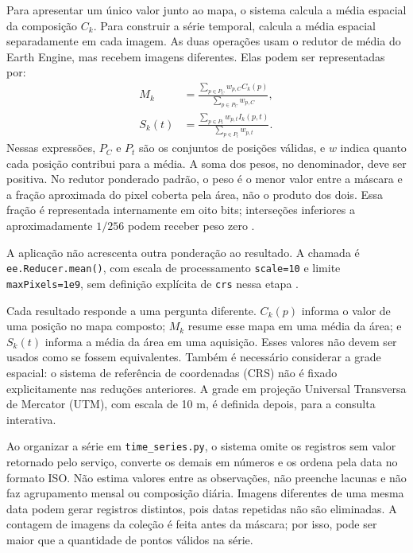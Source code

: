Para apresentar um único valor junto ao mapa, o sistema calcula a média espacial da composição $C_k$. Para construir a série temporal, calcula a média espacial separadamente em cada imagem. As duas operações usam o redutor de média do Earth Engine, mas recebem imagens diferentes. Elas podem ser representadas por:
\begin{align}
 M_k&=\frac{\sum_{p\in P_C}w_{p,C}C_k(p)}
                {\sum_{p\in P_C}w_{p,C}},\label{eq:media-composto}\\
 S_k(t)&=\frac{\sum_{p\in P_t}w_{p,t}I_k(p,t)}
                  {\sum_{p\in P_t}w_{p,t}}.\label{eq:serie-final}
\end{align}
Nessas expressões, $P_C$ e $P_t$ são os conjuntos de posições válidas, e $w$ indica quanto cada posição contribui para a média. A soma dos pesos, no denominador, deve ser positiva. No redutor ponderado padrão, o peso é o menor valor entre a máscara e a fração aproximada do pixel coberta pela área, não o produto dos dois. Essa fração é representada internamente em oito bits; interseções inferiores a aproximadamente $1/256$ podem receber peso zero \citep{GOOGLE_EE_REGION}.

A aplicação não acrescenta outra ponderação ao resultado. A chamada é \texttt{ee.Reducer.mean()}, com escala de processamento \texttt{scale=10} e limite \texttt{maxPixels=1e9}, sem definição explícita de \texttt{crs} nessa etapa \citep{GOOGLE_EE_REDUCE}.

Cada resultado responde a uma pergunta diferente. $C_k(p)$ informa o valor de uma posição no mapa composto; $M_k$ resume esse mapa em uma média da área; e $S_k(t)$ informa a média da área em uma aquisição. Esses valores não devem ser usados como se fossem equivalentes. Também é necessário considerar a grade espacial: o sistema de referência de coordenadas (CRS) não é fixado explicitamente nas reduções anteriores. A grade em projeção Universal Transversa de Mercator (UTM), com escala de 10 m, é definida depois, para a consulta interativa.

Ao organizar a série em \texttt{time\_series.py}, o sistema omite os registros sem valor retornado pelo serviço, converte os demais em números e os ordena pela data no formato ISO. Não estima valores entre as observações, não preenche lacunas e não faz agrupamento mensal ou composição diária. Imagens diferentes de uma mesma data podem gerar registros distintos, pois datas repetidas não são eliminadas. A contagem de imagens da coleção é feita antes da máscara; por isso, pode ser maior que a quantidade de pontos válidos na série.

